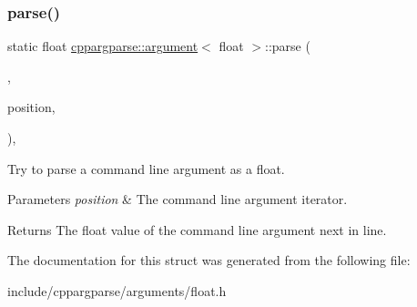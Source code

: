 \subsubsection{\texorpdfstring{parse()}{parse()}}
{\footnotesize\ttfamily static float \hyperlink{structcppargparse_1_1argument}{cppargparse\+::argument}$<$ float $>$\+::parse (\begin{DoxyParamCaption}\item[{const \hyperlink{types_8h_a80adf2418b7ce9fe616698efa7533ecf}{types\+::\+Command\+Line\+\_\+t} \&}]{,  }\item[{const \hyperlink{types_8h_a43b4f43f8940de1bf09ced6f1b668053}{types\+::\+Command\+Line\+Position\+\_\+t} \&}]{position,  }\item[{const \hyperlink{types_8h_a003c660afe2ee9c6cc39aea966e8926d}{types\+::\+Command\+Line\+Arguments\+\_\+t} \&}]{ }\end{DoxyParamCaption})\hspace{0.3cm}{\ttfamily [inline]}, {\ttfamily [static]}}



Try to parse a command line argument as a float. 


\begin{DoxyParams}{Parameters}
{\em position} & The command line argument iterator.\\
\hline
\end{DoxyParams}
\begin{DoxyReturn}{Returns}
The float value of the command line argument next in line. 
\end{DoxyReturn}


The documentation for this struct was generated from the following file\+:\begin{DoxyCompactItemize}
\item 
include/cppargparse/arguments/float.\+h\end{DoxyCompactItemize}
